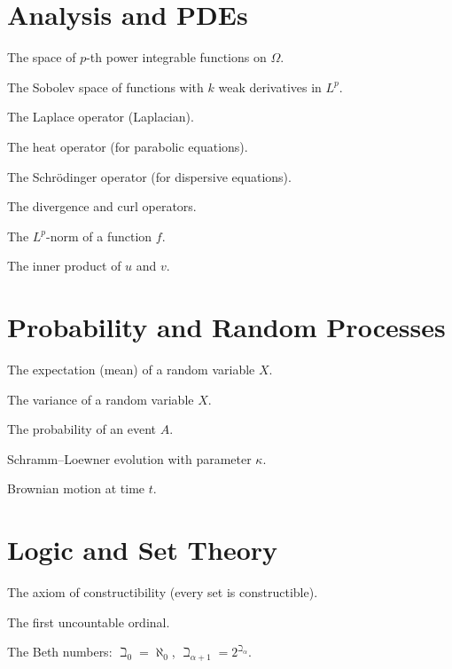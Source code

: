 \documentclass[12pt,a4paper]{book}
\theoremstyle{definition}
\theoremstyle{remark}
\let\origOmega\Omega
\def\Omega{\ensuremath{\origOmega}}
\let\origDelta\Delta
\def\Delta{\ensuremath{\origDelta}}
\let\origalpha\alpha
\def\alpha{\ensuremath{\origalpha}}
\let\origkappa\kappa
\def\kappa{\ensuremath{\origkappa}}
\let\origomega\omega
\def\omega{\ensuremath{\origomega}}
\begin{document}
\section*{Analysis and PDEs}
\begin{description}[style=nextline, leftmargin=2cm]
\item[$L^p(\Omega)$] The space of $p$-th power integrable functions on $\Omega$.
\item[$W^{k,p}(\Omega)$] The Sobolev space of functions with $k$ weak derivatives in $L^p$.
\item[$\Delta$] The Laplace operator (Laplacian).
\item[$\partial_t - \Delta$] The heat operator (for parabolic equations).
\item[$i\partial_t - \Delta$] The Schr\"{o}dinger operator (for dispersive equations).
\item[$\nabla \cdot, \nabla \times$] The divergence and curl operators.
\item[$\|f\|_{L^p}$] The $L^p$-norm of a function $f$.
\item[$\langle u, v \rangle$] The inner product of $u$ and $v$.
\end{description}

\section*{Probability and Random Processes}
\begin{description}[style=nextline, leftmargin=2cm]
\item[{$\mathbb{E}[X]$}] The expectation (mean) of a random variable $X$.
\item[$\text{Var}(X)$] The variance of a random variable $X$.
\item[$\mathbb{P}(A)$] The probability of an event $A$.
\item[$SLE_{\kappa}$] Schramm--Loewner evolution with parameter $\kappa$.
\item[$\text{BM}_t$] Brownian motion at time $t$.
\end{description}

\section*{Logic and Set Theory}
\begin{description}[style=nextline, leftmargin=2cm]
\item[$V = L$] The axiom of constructibility (every set is constructible).
\item[$\omega_1$] The first uncountable ordinal.
\item[$\beth_{\alpha}$] The Beth numbers: $\beth_0 = \aleph_0$, $\beth_{\alpha+1} = 2^{\beth_{\alpha}}$.
\end{description}
\end{document}
